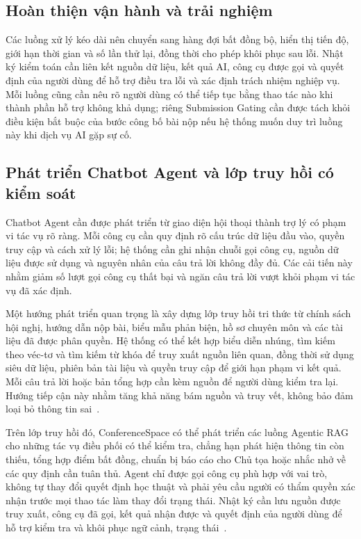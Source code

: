 \subsection{Hoàn thiện vận hành và trải nghiệm}

Các luồng xử lý kéo dài nên chuyển sang hàng đợi bất đồng bộ, hiển thị tiến độ, giới hạn thời gian và số lần thử lại, đồng thời cho phép khôi phục sau lỗi. Nhật ký kiểm toán cần liên kết nguồn dữ liệu, kết quả AI, công cụ được gọi và quyết định của người dùng để hỗ trợ điều tra lỗi và xác định trách nhiệm nghiệp vụ. Mỗi luồng cũng cần nêu rõ người dùng có thể tiếp tục bằng thao tác nào khi thành phần hỗ trợ không khả dụng; riêng Submission Gating cần được tách khỏi điều kiện bắt buộc của bước công bố bài nộp nếu hệ thống muốn duy trì luồng này khi dịch vụ AI gặp sự cố.

\subsection{Phát triển Chatbot Agent và lớp truy hồi có kiểm soát}

Chatbot Agent cần được phát triển từ giao diện hội thoại thành trợ lý có phạm vi tác vụ rõ ràng. Mỗi công cụ cần quy định rõ cấu trúc dữ liệu đầu vào, quyền truy cập và cách xử lý lỗi; hệ thống cần ghi nhận chuỗi gọi công cụ, nguồn dữ liệu được sử dụng và nguyên nhân của câu trả lời không đầy đủ. Các cải tiến này nhằm giảm số lượt gọi công cụ thất bại và ngăn câu trả lời vượt khỏi phạm vi tác vụ đã xác định.

Một hướng phát triển quan trọng là xây dựng lớp truy hồi tri thức từ chính sách hội nghị, hướng dẫn nộp bài, biểu mẫu phản biện, hồ sơ chuyên môn và các tài liệu đã được phân quyền. Hệ thống có thể kết hợp biểu diễn nhúng, tìm kiếm theo véc-tơ và tìm kiếm từ khóa để truy xuất nguồn liên quan, đồng thời sử dụng siêu dữ liệu, phiên bản tài liệu và quyền truy cập để giới hạn phạm vi kết quả. Mỗi câu trả lời hoặc bản tổng hợp cần kèm nguồn để người dùng kiểm tra lại. Hướng tiếp cận này nhằm tăng khả năng bám nguồn và truy vết, không bảo đảm loại bỏ thông tin sai~\cite{ch5ref1}.

Trên lớp truy hồi đó, ConferenceSpace có thể phát triển các luồng Agentic RAG cho những tác vụ điều phối có thể kiểm tra, chẳng hạn phát hiện thông tin còn thiếu, tổng hợp điểm bất đồng, chuẩn bị báo cáo cho Chủ tọa hoặc nhắc nhở về các quy định cần tuân thủ. Agent chỉ được gọi công cụ phù hợp với vai trò, không tự thay đổi quyết định học thuật và phải yêu cầu người có thẩm quyền xác nhận trước mọi thao tác làm thay đổi trạng thái. Nhật ký cần lưu nguồn được truy xuất, công cụ đã gọi, kết quả nhận được và quyết định của người dùng để hỗ trợ kiểm tra và khôi phục ngữ cảnh, trạng thái~\cite{ch5ref2,ch5ref5,ch5ref6,ch5ref7}.

